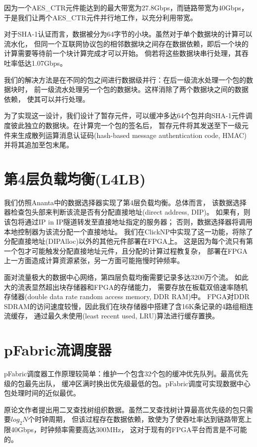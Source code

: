 因为一个AES\_CTR元件能达到的最大带宽为27.8Gbps，而链路带宽为40Gbps，
于是我们让两个AES\_CTR元件并行地工作，以充分利用带宽。

对于SHA-1认证而言，数据被分为64字节的小块。虽然对于单个数据块的计算可以流水化，
但同一个互联网协议包的相邻数据块之间存在数据依赖，即后一个块的计算需要等待前一个块计算完成才可以开始。
倘若将这些数据块串行处理，其吞吐率低达1.07Gbps。

我们的解决方法是在不同的包之间进行数据级并行：在后一级流水处理一个包的数据块时，
前一级流水处理另一个包的数据块。这样消除了两个数据块之间的数据依赖，
使其可以并行处理。

为了实现这一设计，我们设计了暂存元件，可以缓冲多达64个包并向SHA-1元件调度彼此独立的数据块。在计算完一个包的签名后，
暂存元件将其发送至下一级元件来生成散列运算消息认证码(hash-based message authentication code, HMAC)并将其追加至包末尾。

\section{第4层负载均衡(L4LB)}
我们仿照Ananta\cite{Patel:2013:ACS:2486001.2486026}中的数据选择器实现了第4层负载均衡。总体而言，
该数据选择器检查包头部来判断该流是否有分配直接地址(direct address, DIP)。
如果有，则该包将通过IP in IP隧道转发至直接地址指定的服务器；
否则，数据选择器将调用本地控制器为该流分配一个直接地址。
我们在ClickNP中实现了这一功能，将除了分配直接地址(DIPAlloc)以外的其他元件部署在FPGA上。
这是因为每个流只有第一个包才可能触发分配直接地址元件，且分配的计算过程教复杂，
部署在FPGA上一方面造成计算资源紧张，另一方面可能拖慢时钟频率。

面对流量极大的数据中心网络，第四层负载均衡需要记录多达3200万个流。
如此大的流表显然超出块存储器和FPGA的存储能力，
需要存放在板载双倍速率随机存储器(double data rate random access memory, DDR RAM)中。
FPGA对DDR SDRAM的访问速度较慢，因此我们在块存储器中搭建了含16K条记录的4路组相连流缓存，
通过最久未使用(least recent used, LRU)算法进行缓存置换。

\section{pFabric流调度器}
pFabric调度器\cite{Alizadeh:2013:PMN:2486001.2486031}工作原理较简单：维护一个包含32个包的缓冲优先队列。最高优先级的包最先出队，
缓冲区满时换出优先级最低的包。pFabric调度可实现数据中心包处理时间的近似最优。

原论文作者提出用二叉查找树组织数据。虽然二叉查找树计算最高优先级的包只需要$log_2N$个时钟周期，
但该过程存在数据依赖，致使为了使吞吐率达到链路带宽上限40Gbps，时钟频率需要高达300MHz，
这对于现有的FPGA平台而言是不可能的。

